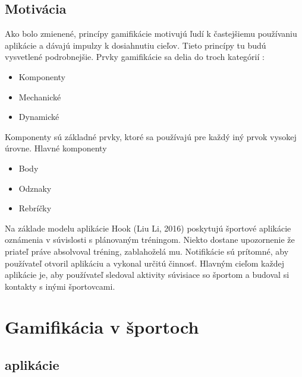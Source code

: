 \documentclass[10pt,twoside,slovak,a4paper]{article}
\begin{document}
\subsection{Motivácia}
Ako bolo zmienené, princípy gamifikácie motivujú ľudí k častejšiemu používaniu aplikácie a dávajú impulzy k dosiahnutiu cieľov. Tieto princípy tu budú vysvetlené podrobnejšie. 
Prvky gamifikácie sa delia do troch kategórií :
\begin{itemize}
  \item {Komponenty}
  \item {Mechanické}
  \item {Dynamické}
\end{itemize}
Komponenty sú základné prvky, ktoré sa používajú pre každý iný prvok vysokej úrovne. Hlavné komponenty
\begin{itemize}
  \item {Body}
  \item {Odznaky}
  \item {Rebríčky}
\end{itemize}

Na základe modelu aplikácie Hook (Liu Li, 2016) poskytujú športové aplikácie oznámenia v súvislosti s plánovaným tréningom. Niekto dostane upozornenie že priateľ práve absolvoval tréning, zablahoželá mu. Notifikácie sú prítomné, aby používateľ otvoril aplikáciu a vykonal určitú činnosť. Hlavným cieľom každej aplikácie je, aby používateľ sledoval aktivity súvisiace so športom a budoval si kontakty s inými športovcami.

\section{Gamifikácia v športoch}
\subsection{aplikácie}
\end{document}
